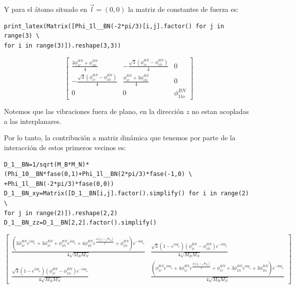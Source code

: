\documentclass[12pt,a4paper]{article}
\begin{document}
Y para el átomo situado en \(\vec l= (0,0)\) la matriz de constantes de fuerza es:

\begin{verbatim}
print_latex(Matrix([Phi_1l__BN(-2*pi/3)[i,j].factor() for j in range(3) \
for i in range(3)]).reshape(3,3))
\end{verbatim}

\begin{equation}
\left[\begin{matrix}\frac{3 \phi^{BN}_{1r} + \phi^{BN}_{1ti}}{4} & - \frac{\sqrt{3} \left(\phi^{BN}_{1r} - \phi^{BN}_{1ti}\right)}{4} & 0\\- \frac{\sqrt{3} \left(\phi^{BN}_{1r} - \phi^{BN}_{1ti}\right)}{4} & \frac{\phi^{BN}_{1r} + 3 \phi^{BN}_{1ti}}{4} & 0\\0 & 0 & \phi^{BN}_{1to}\end{matrix}\right]
\end{equation}

Notemos que las vibraciones fuera de plano, en la dirección \(z\) no estan acopladas a las interplanares.


Por lo tanto, la contribución a matriz dinámica que tenemos por parte de la interacción de estos primeros vecinos es:


\begin{verbatim}
D_1__BN=1/sqrt(M_B*M_N)*(Phi_10__BN*fase(0,1)+Phi_1l__BN(2*pi/3)*fase(-1,0) \
+Phi_1l__BN(-2*pi/3)*fase(0,0))
D_1__BN_xy=Matrix([D_1__BN[i,j].factor().simplify() for i in range(2) \
for j in range(2)]).reshape(2,2)
D_1__BN_zz=D_1__BN[2,2].factor().simplify()
\end{verbatim}

\begin{equation}
\left[\begin{smallmatrix}\frac{\left(3 \phi^{BN}_{1r} e^{i a q_{x}} + 3 \phi^{BN}_{1r} + \phi^{BN}_{1ti} e^{i a q_{x}} + 4 \phi^{BN}_{1ti} e^{\frac{i a \left(q_{x} + \sqrt{3} q_{y}\right)}{2}} + \phi^{BN}_{1ti}\right) e^{- i a q_{x}}}{4 \sqrt{M_{B} M_{N}}} & \frac{\sqrt{3} \left(1 - e^{i a q_{x}}\right) \left(\phi^{BN}_{1r} - \phi^{BN}_{1ti}\right) e^{- i a q_{x}}}{4 \sqrt{M_{B} M_{N}}}\\\frac{\sqrt{3} \left(1 - e^{i a q_{x}}\right) \left(\phi^{BN}_{1r} - \phi^{BN}_{1ti}\right) e^{- i a q_{x}}}{4 \sqrt{M_{B} M_{N}}} & \frac{\left(\phi^{BN}_{1r} e^{i a q_{x}} + 4 \phi^{BN}_{1r} e^{\frac{i a \left(q_{x} + \sqrt{3} q_{y}\right)}{2}} + \phi^{BN}_{1r} + 3 \phi^{BN}_{1ti} e^{i a q_{x}} + 3 \phi^{BN}_{1ti}\right) e^{- i a q_{x}}}{4 \sqrt{M_{B} M_{N}}}\end{smallmatrix}\right]
\label{eq:1}

\end{equation}
\end{document}
